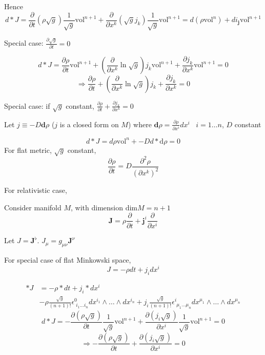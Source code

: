 Hence
\begin{equation}
  d*J = \frac{ \partial }{ \partial t} (\rho \sqrt{g} ) \frac{1}{ \sqrt{g}} \text{vol}^{n+1} + \frac{ \partial }{ \partial x^k} (\sqrt{g} j_k) \frac{1}{ \sqrt{g}} \text{vol}^{n+1} = d(\rho \text{vol}^n) + di_{\mathbf{j}} \text{vol}^{n+1}
\end{equation}

Special case: $\frac{ \partial \sqrt{g}}{ \partial t} = 0$

\[
d*J = \frac{ \partial \rho}{ \partial t} \text{vol}^{n+1} + \left( \frac{ \partial }{ \partial x^k} \ln{ \sqrt{g}} \right) j_k \text{vol}^{n+1} + \frac{ \partial j_k}{ \partial x^k} \text{vol}^{n+1} = 0 
\]
\[
\Longrightarrow \frac{ \partial \rho }{ \partial t} + \left( \frac{ \partial }{ \partial x^k} \ln{ \sqrt{g}} \right) j_k + \frac{ \partial j_k }{ \partial x^k } = 0 
\]

Special case: if $\sqrt{g}$ constant, $\frac{ \partial \rho }{ \partial t } + \frac{ \partial j_k}{ \partial x^k} = 0 $

Let $j \equiv -D \mathbf{d}\rho$ ($j$ is a closed form on $M$) where $\mathbf{d}\rho = \frac{ \partial \rho }{ \partial x^i } dx^i$ \quad \, $i=1 \dots n$, $D$ constant

\[
d * J  = d\rho \text{vol}^n + - Dd * \text{d}\rho = 0 
\]
For flat metric, $\sqrt{g}$ constant,
\[
\frac{ \partial \rho }{ \partial t} = D \frac{ \partial^2 \rho }{ ( \partial x^k )^2}
\]

For relativistic case, 

Consider manifold $M$, with dimension $\text{dim}M = n+1$
\[
\mathbf{J} = \rho \frac{ \partial }{ \partial t} + \mathbf{j}^i \frac{ \partial }{ \partial x^i}
\]

Let $J = \mathbf{J}^{\flat}$.  $J_{\mu} = g_{\mu \nu} \mathbf{J}^{\nu}$

For special case of flat Minkowski space,
\[
J  = - \rho dt + j_i dx^i
\]

\[
\begin{aligned}
  *J & = - \rho * dt + j_i * dx^i \\ 
  & -\rho \frac{ \sqrt{g}}{ (n+1)!} \epsilon^0_{ \, \, i_1 \dots i_n} dx^{i_1} \wedge \dots \wedge dx^{i_n} + j_i \frac{ \sqrt{g} }{ (n+1)!} \epsilon^i_{ \, \, \mu_1 \dots \mu_n } dx^{\mu_1} \wedge \dots \wedge dx^{\mu_n}
\end{aligned}
\]
\[
d* J = -\frac{ \partial (\rho \sqrt{g}  )}{  \partial t } \frac{1}{ \sqrt{g} } \text{vol}^{n+1} + \frac{ \partial (j_i \sqrt{g} )}{  \partial x^i } \frac{1}{ \sqrt{g}} \text{vol}^{n+1} = 0 
\]
\[
\Longrightarrow - \frac{ \partial (\rho \sqrt{g})}{  \partial t} + \frac{ \partial (j_i \sqrt{g} )}{ \partial x^i } = 0 
\]

